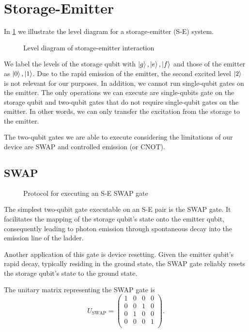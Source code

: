 \section{Storage-Emitter}
\label{sec:S-E}

In \cref{fig:level_S-E} we illustrate the level diagram for a storage-emitter (S-E) system.
\begin{figure}[h]
    \centering
    
    \vspace{-1cm}
    \caption{Level diagram of storage-emitter interaction}
    \label{fig:level_S-E}
\end{figure}

We label the levels of the storage qubit with $\ket{g}, \ket{e}, \ket{f}$ and those of the emitter as $\ket{0}, \ket{1}$.
Due to the rapid emission of the emitter, the second excited level $\ket{2}$ is not relevant for our purposes.
In addition, we cannot run single-qubit gates on the emitter.
The only operations we can execute are single-qubits gate on the storage qubit and two-qubit gates that do not require single-qubit gates on the emitter.
In other words, we can only transfer the excitation from the storage to the emitter.

The two-qubit gates we are able to execute considering the limitations of our device are SWAP and controlled emission (or CNOT).

\subsection{SWAP}

\begin{figure}
    \centering
    
    \vspace{-1cm}
    \caption{Protocol for executing an S-E SWAP gate}
    \label{fig:S-E_SWAP}
\end{figure}

The simplest two-qubit gate executable on an S-E pair is the SWAP gate. 
It facilitates the mapping of the storage qubit's state onto the emitter qubit, consequently leading to photon emission through spontaneous decay into the emission line of the ladder.

Another application of this gate is device resetting.
Given the emitter qubit's rapid decay, typically residing in the ground state, the SWAP gate reliably resets the storage qubit's state to the ground state.

The unitary matrix representing the SWAP gate is
\begin{equation}
    U_{\text{SWAP}} = 
    \begin{pmatrix}
    1 & 0 & 0 & 0 \\
    0 & 0 & 1 & 0 \\
    0 & 1 & 0 & 0 \\
    0 & 0 & 0 & 1 \\
\end{pmatrix}.
\end{equation}

